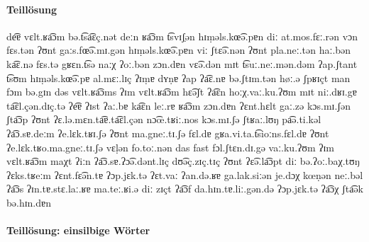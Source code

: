 \paragraph*{Teillösung}

\raggedright

\begin{exe}
  \ex de͡ɐ vɛlt.ʁa͡ɔm bə.t͡sa͡ɛç.nət deːn ʁa͡ɔm t͡svɪʃ̣ən hɪṃəls.kœ͡ə.pɐn
  \ex diː at.mos.fɛː.rən vɔn fɛs.tən ʔʊnt gaːs.fœ͡ə.mɪ.gən hɪṃəls.kœ͡ə.pɐn viː ʃtɛ͡ə.nən ʔʊnt pla.neː.tən haː.bən ka͡ɛ.nə fɛs.tə gʁɛn.t͡sə naːχ ʔoː.bən zɔn.dɐn vɛ͡ə.dən mɪt t͡suː.neː.mən.dəm ʔap.ʃtant t͡sʊm hɪṃəls.kœ͡ə.pɐ al.mɛː.lɪç ʔɪṃɐ dʏṇɐ
  \ex ʔap ʔa͡ɛ.nɐ bə.ʃtɪm.tən høː.ə ʃpʁɪçt man fɔm bə.gɪn dəs vɛlt.ʁa͡ɔms
  \ex ʔɪm vɛlt.ʁa͡ɔm hɛ͡əʃt ʔa͡ɛn hoːχ.vaː.ku.ʔʊm mɪt niː.dʁɪ.gɐ ta͡ɛl.çən.dɪç.tə
  \ex ʔe͡ɐ ʔɪst ʔaː.bɐ ka͡ɛn leː.rɐ ʁa͡ɔm zɔn.dɐn ʔɛnt.hɛlt gaː.zə kɔs.mɪ.ʃən ʃta͡ɔp ʔʊnt ʔɛ.lə.mɛn.ta͡ɐ.ta͡ɛl.çən nɔ͡œ.tʁiː.nos kɔs.mɪ.ʃə ʃtʁaː.lʊŋ pa͡ə.ti.kəl ʔa͡ɔ.sɐ.deːm ʔe.lɛk.tʁɪ.ʃə ʔʊnt ma.gneː.tɪ.ʃə fɛl.dɐ gʁa.vi.ta.t͡sioːns.fɛl.dɐ ʔʊnt ʔe.lɛk.tʁo.ma.gneː.tɪ.ʃə vɛḷən fo.toː.nən
  \ex das fast fɔl.ʃtɛn.dɪ.gə vaː.ku.ʔʊm ʔɪm vɛlt.ʁa͡ɔm maχt ʔiːn ʔa͡ɔ.sɐ.ʔɔ͡ə.dənt.lɪç dʊ͡əç.zɪç.tɪç ʔʊnt ʔɛ͡ə.la͡ɔpt diː bə.ʔoː.baχ.tʊŋ ʔɛks.tʁeːm ʔɛnt.fɛ͡ən.tɐ ʔɔp.jɛk.tə ʔɛt.vaː ʔan.də.ʁɐ ga.lak.siːən
  \ex je.dɔχ kœṇən neː.bəl ʔa͡ɔs ʔɪn.tɐ.stɛ.laː.ʁɐ ma.teː.ʁi.ə diː zɪçt ʔa͡ɔf da.hɪn.tɐ.liː.gən.də ʔɔp.jɛk.tə ʔa͡ɔχ ʃta͡ək bə.hɪn.dɐn
\end{exe}

\justifying



\paragraph*{Teillösung: einsilbige Wörter}

